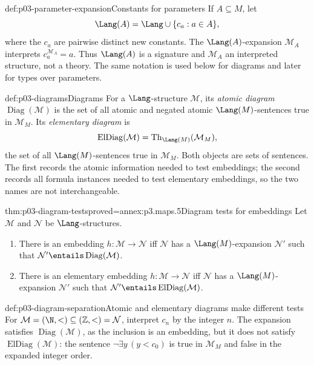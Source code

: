 \begin{hbdefinition}{def:p03-parameter-expansion}{Constants for parameters}
If \(A\subseteq M\), let
\[
 \Lang(A)=\Lang\cup\{c_a:a\in A\},
\]
 where the \(c_a\) are pairwise distinct new constants.  The
 \(\Lang(A)\)-expansion \(\mathcal M_A\) interprets
 \(c_a^{\mathcal M_A}=a\).  Thus \(\Lang(A)\) is a signature and
 \(\mathcal M_A\) an interpreted structure, not a theory.  The same notation
 is used below for diagrams and later for types over parameters.
\end{hbdefinition}

\begin{hbdefinition}{def:p03-diagrams}{Diagrams}
For a \(\Lang\)-structure \(\mathcal M\), its \emph{atomic diagram}
\(\operatorname{Diag}(\mathcal M)\) is the set of all atomic and negated
atomic \(\Lang(M)\)-sentences true in \(\mathcal M_M\).  Its
\emph{elementary diagram} is
\[
 \operatorname{ElDiag}(\mathcal M)
 =\operatorname{Th}_{\Lang(M)}(\mathcal M_M),
 \]
 the set of all \(\Lang(M)\)-sentences true in \(\mathcal M_M\).  Both objects
 are sets of sentences.  The first records the atomic information needed to
 test embeddings; the second records all formula instances needed to test
 elementary embeddings, so the two names are not interchangeable.
\end{hbdefinition}

\begin{hbtheorem}{thm:p03-diagram-tests}{proved=annex:p3.maps.5}{Diagram tests for embeddings}
Let \(\mathcal M\) and \(\mathcal N\) be \(\Lang\)-structures.
\begin{enumerate}
 \item There is an embedding \(h:\mathcal M\to\mathcal N\) iff
       \(\mathcal N\) has a \(\Lang(M)\)-expansion \(\mathcal N'\) such that
       \(\mathcal N'\entails\operatorname{Diag}(\mathcal M)\).
 \item There is an elementary embedding \(h:\mathcal M\to\mathcal N\) iff
       \(\mathcal N\) has a \(\Lang(M)\)-expansion \(\mathcal N'\) such that
       \(\mathcal N'\entails\operatorname{ElDiag}(\mathcal M)\).
\end{enumerate}
\end{hbtheorem}

\begin{hbexample}{def:p03-diagram-separation}{Atomic and elementary diagrams make different tests}
For \(\mathcal M=(\N,<)\subseteq(\mathbb Z,<)=\mathcal N\), interpret \(c_n\)
by the integer \(n\).  The expansion satisfies
\(\operatorname{Diag}(\mathcal M)\), as the inclusion is an embedding, but it
does not satisfy \(\operatorname{ElDiag}(\mathcal M)\): the sentence
\(\neg\exists y\,(y<c_0)\) is true in \(\mathcal M_M\) and false in the
expanded integer order.
\end{hbexample}

